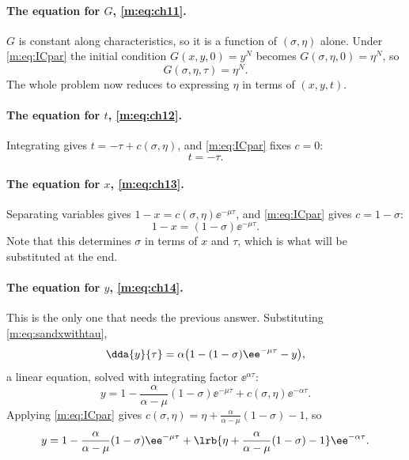 \paragraph{The equation for $G$, \eqref{m:eq:ch11}.}
$G$ is constant along characteristics, so it is a function of $(\sigma,\eta)$
alone. Under \cref{m:eq:ICpar} the initial condition $G(x,y,0)=y^N$ becomes
$G(\sigma,\eta,0)=\eta^N$, so
\begin{equation}
\label{m:eq:GetaN}
G(\sigma,\eta,\tau) = \eta^N .
\end{equation}
The whole problem now reduces to expressing $\eta$ in terms of $(x,y,t)$.

\paragraph{The equation for $t$, \eqref{m:eq:ch12}.}
Integrating gives $t=-\tau+c(\sigma,\eta)$, and \cref{m:eq:ICpar} fixes $c=0$:
\begin{equation}
\label{m:eq:minustau}
t = -\tau .
\end{equation}

\paragraph{The equation for $x$, \eqref{m:eq:ch13}.}
Separating variables gives $1-x = c(\sigma,\eta)\ee^{-\mu\tau}$, and
\cref{m:eq:ICpar} gives $c=1-\sigma$:
\begin{equation}
\label{m:eq:sandxwithtau}
1-x = (1-\sigma)\ee^{-\mu\tau} .
\end{equation}
Note that this determines $\sigma$ in terms of $x$ and $\tau$, which is what will
be substituted at the end.

\paragraph{The equation for $y$, \eqref{m:eq:ch14}.}
This is the only one that needs the previous answer. Substituting
\cref{m:eq:sandxwithtau},
\begin{equation*}
\dda{y}{\tau} = \alpha\bigl(1-(1-\sigma)\ee^{-\mu\tau}-y\bigr),
\end{equation*}
a linear equation, solved with integrating factor $\ee^{\alpha\tau}$:
\begin{equation*}
y = 1-\frac{\alpha}{\alpha-\mu}(1-\sigma)\ee^{-\mu\tau} + c(\sigma,\eta)\ee^{-\alpha\tau} .
\end{equation*}
Applying \cref{m:eq:ICpar} gives
$c(\sigma,\eta) = \eta+\frac{\alpha}{\alpha-\mu}(1-\sigma)-1$, so
\begin{equation}
\label{m:eq:ywitheta}
y = 1-\frac{\alpha}{\alpha-\mu}(1-\sigma)\ee^{-\mu\tau}
+ \lrb{\eta+\frac{\alpha}{\alpha-\mu}(1-\sigma)-1}\ee^{-\alpha\tau} .
\end{equation}

